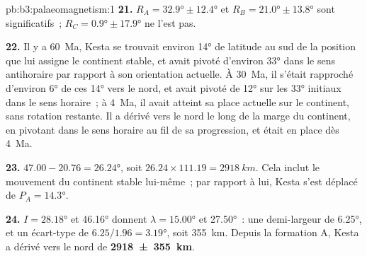 \begin{solution}{pb:b3:palaeomagnetism:1}
\textbf{21.} $R_A = \ang{32.9} \pm \ang{12.4}$ et $R_B = \ang{21.0} \pm
\ang{13.8}$ sont significatifs~; $R_C = \ang{0.9} \pm \ang{17.9}$ ne l'est pas.

\textbf{22.} Il y a \qty{60}{Ma}, Kesta se trouvait environ \ang{14} de latitude
au sud de la position que lui assigne le continent stable, et avait pivoté d'environ \ang{33}
dans le sens antihoraire par rapport à son orientation actuelle. À \qty{30}{Ma}, il s'était
rapproché d'environ \ang{6} de ces \ang{14} vers le nord, et avait pivoté de \ang{12} sur les
\ang{33} initiaux dans le sens horaire~; à \qty{4}{Ma}, il avait atteint sa place actuelle sur le continent,
sans rotation restante. Il a dérivé vers le nord le long de la marge du continent, en pivotant
dans le sens horaire au fil de sa progression, et était en place dès \qty{4}{Ma}.

\textbf{23.} $47.00 - 20.76 = \ang{26.24}$, soit $26.24\times111.19 =
\qty{2918}{km}$. Cela inclut le mouvement du continent stable lui-même~;
par rapport à lui, Kesta s'est déplacé de $P_A = \ang{14.3}$.

\textbf{24.} $I = \ang{28.18}$ et \ang{46.16} donnent $\lambda = \ang{15.00}$ et
\ang{27.50}~: une demi-largeur de \ang{6.25}, et un écart-type de
$6.25/1.96 = \ang{3.19}$, soit \qty{355}{km}. Depuis la formation A, Kesta a dérivé
vers le nord de
\textbf{\qty[text-series-to-math=true]{2918 \pm 355}{km}}.
\end{solution}
